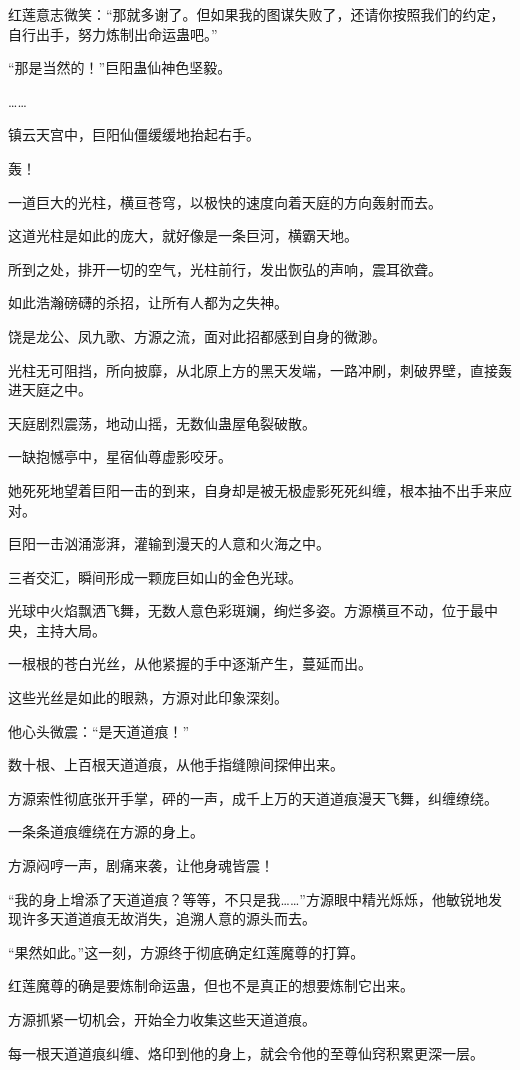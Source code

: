 \begin{this_body}
红莲意志微笑：“那就多谢了。但如果我的图谋失败了，还请你按照我们的约定，自行出手，努力炼制出命运蛊吧。”

“那是当然的！”巨阳蛊仙神色坚毅。

……

镇云天宫中，巨阳仙僵缓缓地抬起右手。

轰！

一道巨大的光柱，横亘苍穹，以极快的速度向着天庭的方向轰射而去。

这道光柱是如此的庞大，就好像是一条巨河，横霸天地。

所到之处，排开一切的空气，光柱前行，发出恢弘的声响，震耳欲聋。

如此浩瀚磅礴的杀招，让所有人都为之失神。

饶是龙公、凤九歌、方源之流，面对此招都感到自身的微渺。

光柱无可阻挡，所向披靡，从北原上方的黑天发端，一路冲刷，刺破界壁，直接轰进天庭之中。

天庭剧烈震荡，地动山摇，无数仙蛊屋龟裂破散。

一缺抱憾亭中，星宿仙尊虚影咬牙。

她死死地望着巨阳一击的到来，自身却是被无极虚影死死纠缠，根本抽不出手来应对。

巨阳一击汹涌澎湃，灌输到漫天的人意和火海之中。

三者交汇，瞬间形成一颗庞巨如山的金色光球。

光球中火焰飘洒飞舞，无数人意色彩斑斓，绚烂多姿。方源横亘不动，位于最中央，主持大局。

一根根的苍白光丝，从他紧握的手中逐渐产生，蔓延而出。

这些光丝是如此的眼熟，方源对此印象深刻。

他心头微震：“是天道道痕！”

数十根、上百根天道道痕，从他手指缝隙间探伸出来。

方源索性彻底张开手掌，砰的一声，成千上万的天道道痕漫天飞舞，纠缠缭绕。

一条条道痕缠绕在方源的身上。

方源闷哼一声，剧痛来袭，让他身魂皆震！

“我的身上增添了天道道痕？等等，不只是我……”方源眼中精光烁烁，他敏锐地发现许多天道道痕无故消失，追溯人意的源头而去。

“果然如此。”这一刻，方源终于彻底确定红莲魔尊的打算。

红莲魔尊的确是要炼制命运蛊，但也不是真正的想要炼制它出来。

方源抓紧一切机会，开始全力收集这些天道道痕。

每一根天道道痕纠缠、烙印到他的身上，就会令他的至尊仙窍积累更深一层。


\end{this_body}
